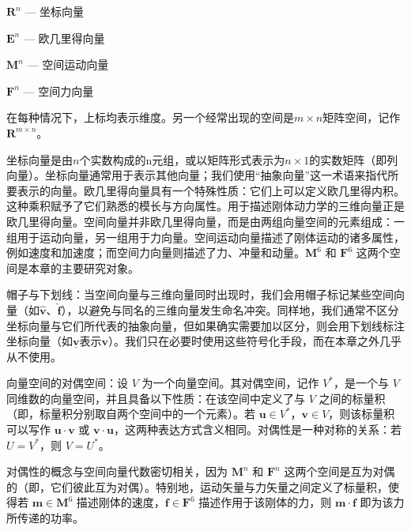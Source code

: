 \documentclass[10pt,a4paper]{book}
\theoremstyle{thmstyle} %
\theoremstyle{defstyle} %
\theoremstyle{prostyle} %
\begin{document}
$\mathbf{R}^{n}$ — 坐标向量



$\mathbf{E}^{n}$ — 欧几里得向量



$\mathbf{M}^{n}$ — 空间运动向量



$\mathbf{F}^{n}$ — 空间力向量



在每种情况下，上标均表示维度。另一个经常出现的空间是$m \times n$矩阵空间，记作$\mathbf{R}^{m \times n}$。



坐标向量是由$n$个实数构成的n元组，或以矩阵形式表示为$n \times 1$的实数矩阵（即列向量）。坐标向量通常用于表示其他向量；我们使用“抽象向量”这一术语来指代所要表示的向量。欧几里得向量具有一个特殊性质：它们上可以定义欧几里得内积。这种乘积赋予了它们熟悉的模长与方向属性。用于描述刚体动力学的三维向量正是欧几里得向量。空间向量并非欧几里得向量，而是由两组向量空间的元素组成：一组用于运动向量，另一组用于力向量。空间运动向量描述了刚体运动的诸多属性，例如速度和加速度；而空间力向量则描述了力、冲量和动量。$\mathbf{M}^{6}$ 和 $\mathbf{F}^{6}$ 这两个空间是本章的主要研究对象。



帽子与下划线：当空间向量与三维向量同时出现时，我们会用帽子标记某些空间向量（如$\hat{\mathbf{v}}$、$\hat{\mathbf{f}}$），以避免与同名的三维向量发生命名冲突。同样地，我们通常不区分坐标向量与它们所代表的抽象向量，但如果确实需要加以区分，则会用下划线标注坐标向量（如$\underline{\mathbf{v}}$表示$\mathbf{v}$）。我们只在必要时使用这些符号化手段，而在本章之外几乎从不使用。



向量空间的对偶空间：设 $V$ 为一个向量空间。其对偶空间，记作 $V^*$，是一个与 $V$ 同维数的向量空间，并且具备以下性质：在该空间中定义了与 $V$ 之间的标量积（即，标量积分别取自两个空间中的一个元素）。若 $\boldsymbol{u} \in V^*$，$\boldsymbol{v} \in V$，则该标量积可以写作 $\boldsymbol{u} \cdot \boldsymbol{v}$ 或 $\boldsymbol{v} \cdot \boldsymbol{u}$，这两种表达方式含义相同。对偶性是一种对称的关系：若 $U = V^*$，则 $V = U^*$。



对偶性的概念与空间向量代数密切相关，因为 $\mathbf{M}^{n}$ 和 $\mathbf{F}^{n}$ 这两个空间是互为对偶的（即，它们彼此互为对偶）。特别地，运动矢量与力矢量之间定义了标量积，使得若 $\boldsymbol{m} \in \mathbf{M}^{6}$ 描述刚体的速度，$\boldsymbol{f} \in \mathbf{F}^{6}$ 描述作用于该刚体的力，则 $\boldsymbol{m} \cdot \boldsymbol{f}$ 即为该力所传递的功率。
\end{document}

